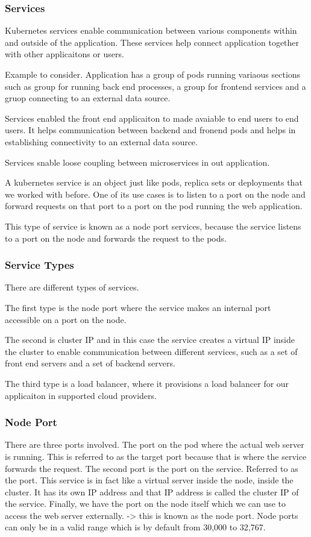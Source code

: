 \documentclass[11pt]{book}
\begin{document}
    \subsubsection{Services}
    Kubernetes services enable communication between various components within and outside of the application.
    These services help connect application together with other applicaitons or users.

    Example to consider. Application has a group of pods running variaous sections such as group for running back end processes, a group for frontend services and a gruop connecting to an external data source.

    Services enabled the front end applicaiton to made avaiable to end users to end users.
    It helps communication between backend and fronend pods and helps in establishing connectivity to an external data source.

    Services snable loose coupling between microservices in out application.

    A kubernetes service is an object just like pods, replica sets or deployments that we worked with before.
    One of its use cases is to listen to a port on the node and forward requests on that port to a port on the pod running the web application.

    This type of service is known as a node port services, because the service listens to a port on the node and forwards the request to the pods.

    \subsubsection{Service Types}
    There are different types of services.

    The first type is the node port where the service makes an internal port accessible on a port on the node.

    The second is cluster IP and in this case the service creates a virtual IP inside the cluster to enable communication between different services, such as a set of front end servers and a set of backend servers.

    The third type is a load balancer, where it provisions a load balancer for our applicaiton in supported cloud providers.

    \subsubsection{Node Port}
    There are three ports involved.
    The port on the pod where the actual web server is running. This is referred to as the target port because that is where the service forwards the request.
    The second port is the port on the service. Referred to as the port. This service is in fact like a virtual server inside the node, inside the cluster.
    It has its own IP address and that IP address is called the cluster IP of the service.
    Finally, we have the port on the node itself which we can use to access the web server externally.
    -> this is known as the node port.
    Node ports can only be in a valid range which is by default from 30,000 to 32,767.
\end{document}
